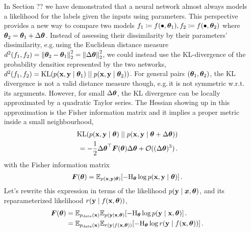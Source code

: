 In Section ??
we have demonstrated that a neural network almost always models a likelihood for the labels given the inputs using parameters.
This perspective provides a new way to compare two models $f_1 \coloneq f(\bullet, {\bm{\theta}}_1), f_2 \coloneq f(\bullet, {\bm{\theta}}_{2})$ where ${\bm{\theta}}_2 = {\bm{\theta}}_1 + \Delta {\bm{\theta}}$.
Instead of assessing their dissimilarity by their parameters' dissimilarity, e.g.\,using the Euclidean distance measure $d^2(f_1, f_2) = \left\lVert {\bm{\theta}}_2 - {\bm{\theta}}_1 \right\rVert_2^2 = \left\lVert \Delta {\bm{\theta}} \right\rVert_2^2$, we could instead use the KL-divergence of the probability densities represented by the two networks, $d^2(f_1, f_2) = \mathrm{KL}(p({\mathbf{x}}, {\mathbf{y}} \mid {\bm{\theta}}_1) \mid\mid p({\mathbf{x}}, {\mathbf{y}} \mid {\bm{\theta}}_2))$.
For general pairs $({\bm{\theta}}_1, {\bm{\theta}}_2)$, the KL divergence is not a valid distance measure though, e.g.\,it is not symmetric w.r.t.\,its arguments.
However, for small $\Delta {\bm{\theta}}$, the KL divergence can be locally approximated by a quadratic Taylor series.
The Hessian showing up in this approximation is the Fisher information matrix and it implies a proper metric inside a small neighbourhood,
\begin{align*}
  \mathrm{KL}(p({\mathbf{x}}, {\mathbf{y}} \mid {\bm{\theta}}) \mid\mid p({\mathbf{x}}, {\mathbf{y}} \mid {\bm{\theta}} + \Delta {\bm{\theta}}))
  \\
  = -\frac{1}{2} {\Delta {\bm{\theta}}}^{\top} {\bm{F}}({\bm{\theta}}) \Delta {\bm{\theta}} + {\mathcal{O}}( (\Delta {\bm{\theta}})^3)\,.
\end{align*}
with the Fisher information matrix
\begin{align*}
  {\bm{F}}({\bm{\theta}}) = \mathbb{E}_{p({\mathbf{x}}, {\mathbf{y}} \mid {\bm{\theta}})} [-\mathrm{H}_{{\bm{\theta}}} \log p({\mathbf{x}}, {\mathbf{y}} \mid {\bm{\theta}})]\,.
\end{align*}
Let's rewrite this expression in terms of the likelihood $p({\mathbf{y}} \mid {\bm{x}}, {\bm{\theta}})$, and its reparameterized likelihood $r({\mathbf{y}} \mid f({\mathbf{x}}, {\bm{\theta}}))$,
\begin{align*}
  {\bm{F}}({\bm{\theta}})
  &=
    \mathbb{E}_{p_{\text{data}}({\mathbf{x}})}\mathbb{E}_{p({\mathbf{y}} \mid {\mathbf{x}}, {\bm{\theta}})} [-\mathrm{H}_{{\bm{\theta}}} \log p({\mathbf{y}} \mid {\mathbf{x}}, {\bm{\theta}})]\,.
  \\
  &=
    \mathbb{E}_{p_{\text{data}}({\mathbf{x}})}\mathbb{E}_{r({\mathbf{y}} \mid f({\mathbf{x}}, {\bm{\theta}}))} [-\mathrm{H}_{{\bm{\theta}}} \log r({\mathbf{y}} \mid f({\mathbf{x}}, {\bm{\theta}}))]\,.
\end{align*}
